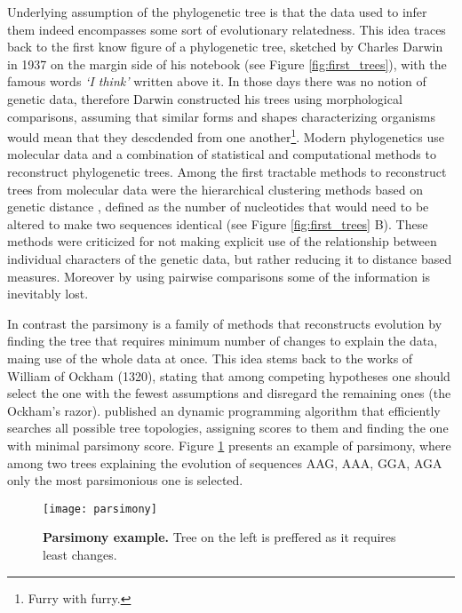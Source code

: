 Underlying assumption of the phylogenetic tree is that the data used to infer them indeed encompasses some sort of evolutionary relatedness.
This idea traces back to the first know figure of a phylogenetic tree, sketched by Charles Darwin in 1937 on the margin side of his notebook (see Figure \ref{fig:first_trees}), with the famous words \emph{`I think'} written above it.
In those days there was no notion of genetic data, therefore Darwin constructed his trees using morphological comparisons, assuming that similar forms and shapes characterizing organisms would mean that they descdended from one another\footnote{Furry with furry.}.
Modern phylogenetics use molecular data and a combination of statistical and computational methods to reconstruct phylogenetic trees.
Among the first tractable methods to reconstruct trees from molecular data were the hierarchical clustering methods based on genetic distance \citep{Fitch1967}, defined as the number of nucleotides that would need to be altered to make two sequences identical (see Figure \ref{fig:first_trees} B).
These methods were criticized for not making explicit use of the relationship between individual characters of the genetic data, but rather reducing it to distance based measures.
Moreover by using pairwise comparisons some of the information is inevitably lost.

In contrast the parsimony is a family of methods that reconstructs evolution by finding the tree that requires minimum number of changes to explain the data, maing use of the whole data at once.
This idea stems back to the works of William of Ockham (1320), stating that among competing hypotheses one should select the one with the fewest assumptions and disregard the remaining ones (the Ockham's razor).
\cite{Fitch1971} published an dynamic programming algorithm that efficiently searches all possible tree topologies, assigning scores to them and finding the one with minimal parsimony score.
Figure \ref{fig:parsimony} presents an example of parsimony, where among two trees explaining the evolution of sequences {\color{green}AAG}, {\color{green}AAA}, {\color{green}GGA}, {\color{green}AGA} only the most parsimonious one is selected.

\begin{figure}[H]
\centering
\texttt{[image: parsimony]} 
\caption{
{ \footnotesize 
{\bf Parsimony example.} Tree on the left is preffered as it requires least changes.
}%
}
\label{fig:parsimony}
\end{figure}


